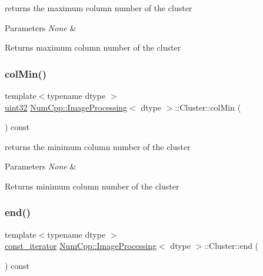 returns the maximum column number of the cluster


\begin{DoxyParams}{Parameters}
{\em None} & \\
\hline
\end{DoxyParams}
\begin{DoxyReturn}{Returns}
maximum column number of the cluster 
\end{DoxyReturn}
\mbox{\label{class_num_cpp_1_1_image_processing_1_1_cluster_ad48f873ecbec96c34292d141864cfc31}} 
\subsubsection{\texorpdfstring{col\+Min()}{colMin()}}
{\footnotesize\ttfamily template$<$typename dtype $>$ \\
\mbox{\hyperlink{namespace_num_cpp_a36f388e948380413c63011cab9b7fbd5}{uint32}} \mbox{\hyperlink{class_num_cpp_1_1_image_processing}{Num\+Cpp\+::\+Image\+Processing}}$<$ dtype $>$\+::Cluster\+::col\+Min (\begin{DoxyParamCaption}{ }\end{DoxyParamCaption}) const\hspace{0.3cm}{\ttfamily [inline]}}

returns the minimum column number of the cluster


\begin{DoxyParams}{Parameters}
{\em None} & \\
\hline
\end{DoxyParams}
\begin{DoxyReturn}{Returns}
minimum column number of the cluster 
\end{DoxyReturn}
\mbox{\label{class_num_cpp_1_1_image_processing_1_1_cluster_af796051228091567f23e5c86e87680af}} 
\subsubsection{\texorpdfstring{end()}{end()}}
{\footnotesize\ttfamily template$<$typename dtype $>$ \\
\mbox{\hyperlink{class_num_cpp_1_1_image_processing_1_1_cluster_a8f26defce53112d60fd1a178b5669ce6}{const\+\_\+iterator}} \mbox{\hyperlink{class_num_cpp_1_1_image_processing}{Num\+Cpp\+::\+Image\+Processing}}$<$ dtype $>$\+::Cluster\+::end (\begin{DoxyParamCaption}{ }\end{DoxyParamCaption}) const\hspace{0.3cm}{\ttfamily [inline]}}

